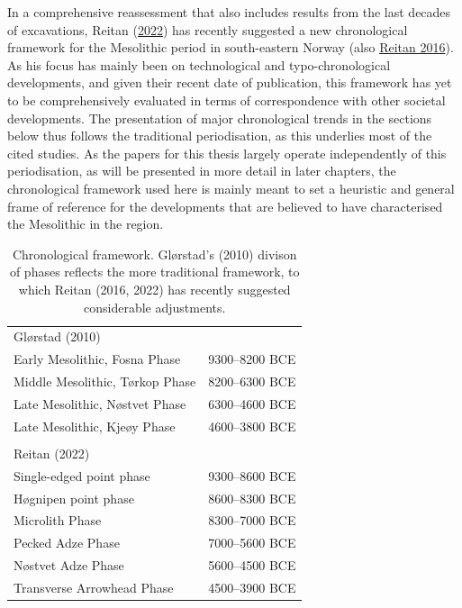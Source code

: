 \documentclass[
  a4paper,
  oneside]{uiophdthesis}
\begin{document}
In a comprehensive reassessment that also includes results from the last decades of excavations, Reitan (\protect\hyperlink{ref-reitan2022}{2022}) has recently suggested a new chronological framework for the Mesolithic period in south-eastern Norway (also \protect\hyperlink{ref-reitan2016}{Reitan 2016}). As his focus has mainly been on technological and typo-chronological developments, and given their recent date of publication, this framework has yet to be comprehensively evaluated in terms of correspondence with other societal developments. The presentation of major chronological trends in the sections below thus follows the traditional periodisation, as this underlies most of the cited studies. As the papers for this thesis largely operate independently of this periodisation, as will be presented in more detail in later chapters, the chronological framework used here is mainly meant to set a heuristic and general frame of reference for the developments that are believed to have characterised the Mesolithic in the region.

\begin{table}

\caption{\label{tab:tab1}Chronological framework. Glørstad's (2010) divison of phases reflects the more traditional framework, to which Reitan (2016, 2022) has recently suggested considerable adjustments.}
\centering
\begin{tabular}[t]{ll}
\toprule
Glørstad (2010) & \\
Early Mesolithic, Fosna Phase & 9300–8200 BCE\\
Middle Mesolithic, Tørkop Phase & 8200–6300 BCE\\
Late Mesolithic, Nøstvet Phase & 6300–4600 BCE\\
Late Mesolithic, Kjeøy Phase & 4600–3800 BCE\\
 & \\
Reitan (2022) & \\
Single-edged point phase & 9300–8600 BCE\\
Høgnipen point phase & 8600–8300 BCE\\
Microlith Phase & 8300–7000 BCE\\
Pecked Adze Phase & 7000–5600 BCE\\
Nøstvet Adze Phase & 5600–4500 BCE\\
Transverse Arrowhead Phase & 4500–3900 BCE\\
\bottomrule
\end{tabular}
\end{table}
\end{document}
